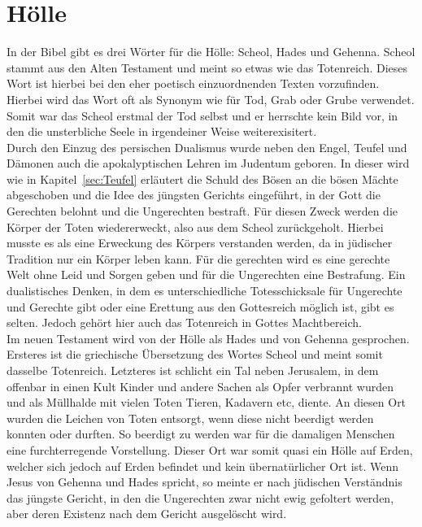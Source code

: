 \chapter{Hölle}
In der Bibel gibt es drei Wörter für die Hölle: Scheol, Hades und Gehenna. Scheol stammt aus den Alten Testament und meint so etwas wie das Totenreich.
Dieses Wort ist hierbei bei den eher poetisch einzuordnenden Texten vorzufinden. Hierbei wird das Wort oft als Synonym wie für Tod, Grab oder Grube verwendet.
Somit war das Scheol erstmal der Tod selbst und er herrschte kein Bild vor, in den die unsterbliche Seele in irgendeiner Weise weiterexisitert.\\

Durch den Einzug des persischen Dualismus wurde neben den Engel, Teufel und Dämonen auch die apokalyptischen Lehren im Judentum geboren. In dieser wird wie in Kapitel\ \ref{sec:Teufel} erläutert die Schuld des Bösen an die bösen Mächte abgeschoben und die Idee des jüngsten Gerichts eingeführt, in der Gott die Gerechten belohnt und die Ungerechten bestraft. Für diesen Zweck werden die Körper der Toten wiedererweckt, also aus dem Scheol zurückgeholt.
Hierbei musste es als eine Erweckung des Körpers verstanden werden, da in jüdischer Tradition nur ein Körper leben kann. Für die gerechten wird es eine gerechte Welt ohne Leid und Sorgen geben und für die Ungerechten eine Bestrafung. Ein dualistisches Denken, in dem es unterschiedliche Totesschicksale für Ungerechte und Gerechte gibt oder eine Erettung aus den Gottesreich möglich ist, gibt es selten.  Jedoch gehört hier auch das Totenreich in Gottes Machtbereich.\\

Im neuen Testament wird von der Hölle als Hades und von Gehenna gesprochen. Ersteres ist die griechische Übersetzung des Wortes Scheol und meint somit dasselbe Totenreich. Letzteres ist schlicht ein Tal neben Jerusalem, in dem offenbar in einen Kult Kinder und andere Sachen als Opfer verbrannt wurden und als Müllhalde mit vielen Toten Tieren, Kadavern etc, diente. An diesen Ort wurden die Leichen von Toten entsorgt, wenn diese nicht beerdigt werden konnten
oder durften. So beerdigt zu werden war für die damaligen Menschen eine furchterregende Vorstellung. Dieser Ort war somit quasi ein \glqq Hölle auf Erden\grqq{}, welcher sich jedoch auf Erden befindet und kein übernatürlicher Ort ist. Wenn Jesus von Gehenna und Hades spricht, so meinte er nach jüdischen Verständnis das jüngste Gericht, in den die Ungerechten zwar nicht ewig gefoltert werden, aber deren Existenz nach dem Gericht ausgelöscht wird.